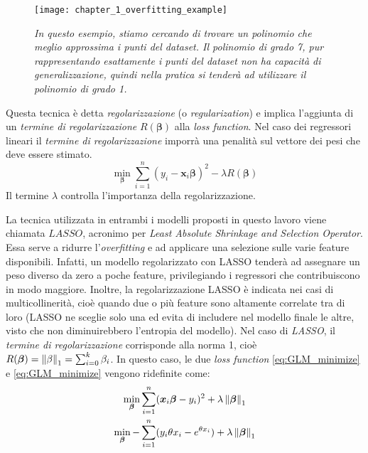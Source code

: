 \begin{figure}[!ht]
\centering
\texttt{[image: chapter\_1\_overfitting\_example]}
\caption{\textit{In questo esempio, stiamo cercando di trovare un polinomio che meglio approssima i punti del dataset. Il polinomio di grado 7, pur rappresentando esattamente i punti del dataset non ha capacità di generalizzazione, quindi nella pratica si tenderà ad utilizzare il polinomio di grado 1.}}
\label{fig:ch_1_overfitting}
\end{figure}

Questa tecnica è detta \textit{regolarizzazione} (o \textit{regularization}) e implica l'aggiunta di un \textit{termine di 
regolarizzazione} $R(\bm{\beta})$ alla \textit{loss function}. Nel caso dei regressori lineari il \textit{termine di 
regolarizzazione} imporrà una penalità sul vettore dei pesi che deve essere stimato.
\begin{equation}
\min_{\bm{\beta}} \sum_{i=1}^{n} (y_i - \bm{x}_i\bm{\beta})^2 - \lambda R(\bm{\beta})
\end{equation}
Il termine $\lambda$ controlla l'importanza della regolarizzazione.
\bigskip

La tecnica utilizzata in entrambi i modelli proposti in questo lavoro viene chiamata $\textit{LASSO}$, acronimo per 
\textit{Least Absolute Shrinkage and Selection Operator}. Essa serve a ridurre l'\textit{overfitting} e ad applicare 
una selezione sulle varie feature disponibili. Infatti, un modello regolarizzato con LASSO tenderà ad assegnare un peso 
diverso da zero a poche feature, privilegiando i regressori che contribuiscono in modo maggiore. Inoltre, la 
regolarizzazione LASSO è indicata nei casi di multicollinerità, cioè quando due o più feature sono altamente correlate tra di 
loro (LASSO ne sceglie solo una ed evita di includere nel modello finale le altre, visto che non diminuirebbero l'entropia 
del modello). Nel caso di \textit{LASSO}, il \textit{termine di regolarizzazione} corrisponde alla norma 1, cioè 
$R(\bm{\beta}) = \left\lVert\bf{\beta}\right\rVert_1 = \sum_{i=0}^k \beta_i$. 
In questo caso, le due \textit{loss function} \eqref{eq:GLM_minimize} e 
\eqref{eq:GLM_minimize} vengono ridefinite come:
\begin{gather}
\min_{\bm{\beta}} \sum_{i=1}^{n} (\bm{x}_i\bm{\beta} - y_i)^2 + \lambda\left\lVert\bm{\beta}\right\rVert_1 \label{eq:OLS_LASSO} \\
\min_{\bm{\beta}} -\sum_{i=1}^n (y_i\theta x_i - e^{\theta x_i} )  + \lambda\left\lVert\bm{\beta}\right\rVert_1 \label{eq:GLM_LASSO}
\end{gather}  


